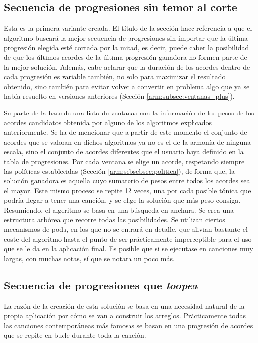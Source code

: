 \subsection{Secuencia de progresiones sin temor al corte}

Esta es la primera variante creada. El título de la sección hace referencia a que el algoritmo buscará la mejor secuencia de progresiones sin importar que la última progresión elegida esté cortada por la mitad, es decir, puede caber la posibilidad de que los últimos acordes de la última progresión ganadora no formen parte de la mejor solución. Además, cabe aclarar que la duración de los acordes dentro de cada progresión es variable también, no solo para maximizar el resultado obtenido, sino también para evitar volver a convertir en problema algo que ya se había resuelto en versiones anteriores  (Sección \ref{arm:subsec:ventanas_plus}).

Se parte de la base de una lista de ventanas con la información de los pesos de los acordes candidatos obtenida por alguno de los algoritmos explicados anteriormente. Se ha de mencionar que a partir de este momento el conjunto de acordes que se valoran en dichos algoritmos ya no es el de la armonía de ninguna escala, sino el conjunto de acordes diferentes que el usuario haya definido en la tabla de progresiones. Por cada ventana se elige un acorde, respetando siempre las políticas establecidas (Sección \ref{arm:sebsebsec:politica}), de forma que, la solución ganadora es aquella cuyo sumatorio de pesos entre todos los acordes sea el mayor. Este mismo proceso se repite 12 veces, una por cada posible tónica  que podría llegar a tener una canción, y se elige la solución que más peso consiga. Resumiendo, el algoritmo se basa en una búsqueda en anchura. Se crea una estructura arbórea que recorre todas las posibilidades. Se utilizan ciertos mecanismos de poda, en los que no se entrará en detalle, que alivian bastante el coste del algoritmo hasta el punto de ser prácticamente imperceptible para el uso que se le da en la aplicación final. Es posible que si se ejecutase en canciones muy largas, con muchas notas, sí que se notara un poco más. 

\subsection{Secuencia de progresiones que \textit{loopea}}

La razón de la creación de esta solución se basa en una necesidad natural de la propia aplicación por cómo se van a construir los arreglos. Prácticamente todas las canciones contemporáneas más famosas se basan en una progresión de acordes que se repite en bucle durante toda la canción. 

